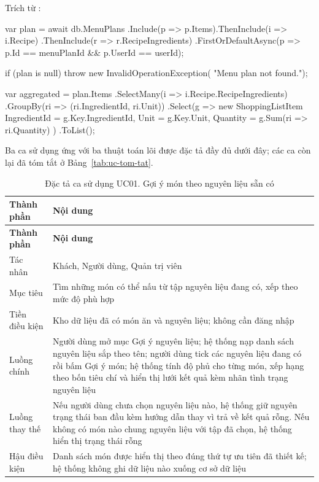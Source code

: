 
{\raggedright Trích từ :\par}

\begin{codeblock}
var plan = await db.MenuPlans
    .Include(p => p.Items).ThenInclude(i => i.Recipe)
        .ThenInclude(r => r.RecipeIngredients)
    .FirstOrDefaultAsync(p =>
        p.Id == menuPlanId && p.UserId == userId);

if (plan is null)
    throw new InvalidOperationException(
        "Menu plan not found.");

var aggregated = plan.Items
    .SelectMany(i => i.Recipe.RecipeIngredients)
    .GroupBy(ri => (ri.IngredientId, ri.Unit))
    .Select(g => new ShoppingListItem
    {
        IngredientId = g.Key.IngredientId,
        Unit = g.Key.Unit,
        Quantity = g.Sum(ri => ri.Quantity)
    })
    .ToList();
\end{codeblock}


Ba ca sử dụng ứng với ba thuật toán lõi được đặc tả đầy đủ dưới đây; các ca còn
lại đã tóm tắt ở Bảng~\ref{tab:uc-tom-tat}.


\begin{longtable}{|P{3.4cm}|P{10.6cm}|}
\caption{Đặc tả ca sử dụng UC01. Gợi ý món theo nguyên liệu sẵn có}
\label{tab:uc01}\\
\hline
\bfseries Thành phần & \bfseries Nội dung \\ \hline
\endfirsthead
\hline
\bfseries Thành phần & \bfseries Nội dung \\ \hline
\endhead
\endfoot
Tác nhân & Khách, Người dùng, Quản trị viên \\ \hline
Mục tiêu & Tìm những món có thể nấu từ tập nguyên liệu đang có, xếp theo mức độ
  phù hợp \\ \hline
Tiền điều kiện & Kho dữ liệu đã có món ăn và nguyên liệu; không cần đăng nhập \\ \hline
Luồng chính & Người dùng mở mục Gợi ý nguyên liệu; hệ thống nạp danh sách nguyên
  liệu sắp theo tên; người dùng tick các nguyên liệu đang có rồi bấm Gợi ý món;
  hệ thống tính độ phủ cho từng món, xếp hạng theo bốn tiêu chí và hiển thị lưới
  kết quả kèm nhãn tình trạng nguyên liệu \\ \hline
Luồng thay thế & Nếu người dùng chưa chọn nguyên liệu nào, hệ thống giữ nguyên
  trạng thái ban đầu kèm hướng dẫn thay vì trả về kết quả rỗng. Nếu không có món
  nào chung nguyên liệu với tập đã chọn, hệ thống hiển thị trạng thái rỗng \\ \hline
Hậu điều kiện & Danh sách món được hiển thị theo đúng thứ tự ưu tiên đã thiết
  kế; hệ thống không ghi dữ liệu nào xuống cơ sở dữ liệu \\ \hline
\end{longtable}

